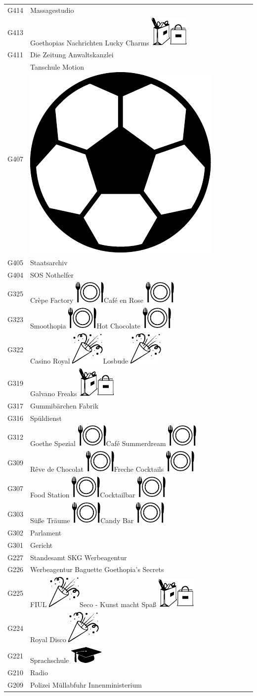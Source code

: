 \documentclass[12pt]{article}
\newcommand{\ball}{\includegraphics[height=.7\baselineskip]{ball.pdf}}
\newcommand{\essen}{\includegraphics[height=.7\baselineskip]{essen.pdf}}
\newcommand{\shopping}{\includegraphics[height=.7\baselineskip]{shopping.pdf}}
\newcommand{\party}{\includegraphics[height=.7\baselineskip]{party.pdf}}
\newcommand{\education}{\includegraphics[height=.7\baselineskip]{education.pdf}}
\begin{document}
\begin{minipage}{.28\textwidth}
    \begin{framed}
        \begin{tabular}{p{1cm}p{5cm}}
            G414 & Massagestudio \\
            G413 & Goethopias Nachrichten \newline Lucky Charms \shopping \\
            G411 & Die Zeitung \newline Anwaltskanzlei \\
            G407 & Tanschule Motion \ball \\
            G405 & Staatsarchiv \\
            G404 & SOS Nothelfer \\
            G325 & Crèpe Factory \essen \newline Café en Rose \essen \\
            G323 & Smoothopia \essen \newline Hot Chocolate \essen \\
            G322 & Casino Royal \party \newline Losbude \party \\
            G319 & Galvano Freaks \shopping \\
            G317 & Gummibärchen Fabrik \\
            G316 & Spüldienst \\
            G312 & Goethe Spezial \essen \newline Café Summerdream \essen \\
            G309 & Rêve de Chocolat \essen \newline Freche Cocktails \essen \\
            G307 & Food Station \essen \newline Cocktailbar \essen \\
            G303 & Süße Träume \essen \newline Candy Bar \essen \\
            G302 & Parlament\\
            G301 & Gericht \\
            G227 & Standesamt \newline SKG Werbeagentur \\
            G226 & Werbeagentur Baguette \newline Goethopia's Secrets \\
            G225 & FIUL \party \newline Seco - Kunst macht Spaß \shopping \\
            G224 & Royal Disco \party \\
            G221 & Sprachschule \education \\
            G210 & Radio \\
            G209 & Polizei \newline Müllabfuhr \newline Innenministerium \\
        \end{tabular}
    \end{framed}
\end{minipage}
\end{document}
